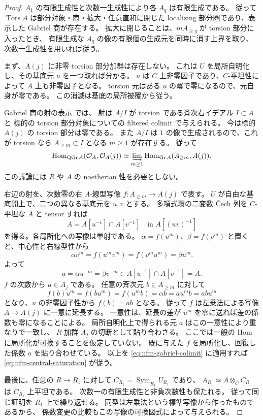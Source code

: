 \begin{proof}
$A_1$ の有限生成性と次数一生成性により各 $A_q$ は有限生成である。
従って $\operatorname{Tors}A$ は部分対象・商・拡大・任意直和に閉じた
localizing 部分圏であり、表示した Gabriel 商が存在する。
拡大に閉じることは、$mA_{\geq q}$ が torsion 部分に入ったとき、
有限生成な $A_q$ の像の有限個の生成元を同時に消す上界を取り、
次数一生成性を用いれば従う。

まず、$A(j)$ に非零 torsion 部分加群は存在しない。
これは $U$ を局所自明化し、その基底元 $u$ を一つ取れば分かる。
$u$ は $C$ 上非零因子であり、$C$-平坦性によって $A$ 上も非零因子となる。
torsion 元はある $u$ の冪で零になるので、元自身が零である。
この消滅は基底の局所被覆から従う。

Gabriel 商の射の表示
\cite[Chapitre~III, \S1, p.~365]{NFMGabrielQuotient} では、
射は $A/I$ が torsion である斉次右イデアル $I\subset A$ と
標的の torsion 部分対象についての filtered colimit で与えられる。
今は標的 $A(j)$ の torsion 部分は零である。
また $A/I$ は $1$ の像で生成されるので、これが torsion なら
$A_{\geq m}\subset I$ となる $m\geq1$ が存在する。
従って
\begin{equation}
\label{eq:nfm-gabriel-colimit}
 \operatorname{Hom}_{\operatorname{QGr}A}
       (\mathcal O_A,\mathcal O_A(j))
 \simeq\varinjlim_{m\geq1}
       \operatorname{Hom}_{\operatorname{Gr}A}
       (A_{\geq m},A(j)).
\end{equation}
この議論には $R$ や $A$ の noetherian 性を必要としない。

右辺の射を、次数零の右 $A$-線型写像
$f:A_{\geq m}\to A(j)$ で表す。
$U$ が自由な基底開上で、二つの異なる基底元を $u,v$ とする。
多項式環の二変数 \v{C}ech 列を $C$-平坦な $A$ と tensor すれば
\[
 A=A[u^{-1}]\cap A[v^{-1}]
       \quad\text{in } A[(uv)^{-1}]
\]
を得る。各局所化への写像は単射である。
$\alpha=f(u^m)$、$\beta=f(v^m)$ と置くと、中心性と右線型性から
\[
 \alpha v^m=f(u^mv^m)=f(v^mu^m)=\beta u^m.
\]
よって
\[
 a=\alpha u^{-m}=\beta v^{-m}
 \in A[u^{-1}]\cap A[v^{-1}]=A.
\]
$f$ の次数から $a\in A_j$ である。
任意の斉次元 $b\in A_{\geq m}$ に対して
\[
 f(b)u^m=f(bu^m)=f(u^mb)=\alpha b=a u^m b=a b u^m
\]
となり、$u$ の非零因子性から $f(b)=ab$ となる。
従って $f$ は左乗法による写像 $A\to A(j)$ に一意に延長する。
一意性は、延長の差が $u^m$ を零に送れば差の係数も零になることによる。
局所自明化上で得られる元 $a$ はこの一意性により重なりで一致し、
$R$-加群 $A_j$ の切断として貼り合わさる。
ここでは一般の Hom に局所化が可換することを仮定していない。
既に与えた $f$ を局所化し、回復した係数 $a$ を貼り合わせている。
以上を \eqref{eq:nfm-gabriel-colimit} に適用すれば
\eqref{eq:nfm-central-saturation} が従う。

最後に、任意の $R\to R_1$ に対して
$C_{R_1}=\operatorname{Sym}_{R_1}U_{R_1}$ であり、
$A_{R_1}\simeq A\otimes_C C_{R_1}$ は $C_{R_1}$ 上平坦である。
次数一の有限生成性と非負次数性も保たれる。
従って同じ証明を $R_1$ 上で繰り返せる。
同型は左乗法という標準写像から作ったものであるから、
係数変更の比較もこの写像の可換図式によって与えられる。
\end{proof}


